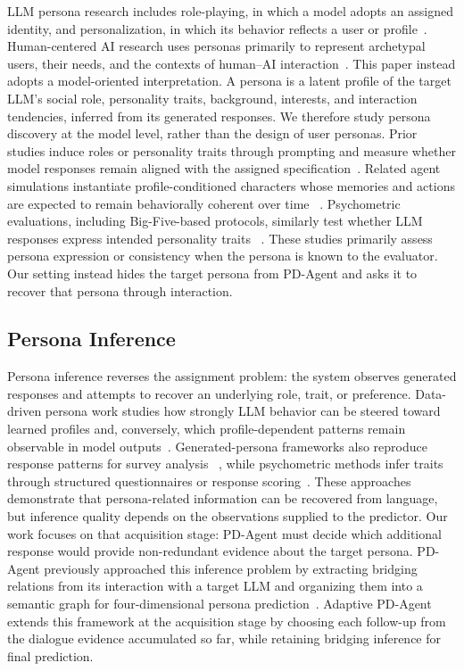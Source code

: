 \documentclass{ieeeaccess}
\begin{document}
LLM persona research includes role-playing, in which a model adopts an assigned identity, and
personalization, in which its behavior reflects a user or profile~\cite{tseng2024survey}.
Human-centered AI research uses personas primarily to represent archetypal users, their
needs, and the contexts of human--AI interaction~\cite{holzinger2022personas}. This paper
instead adopts a model-oriented interpretation. A persona is a latent profile of the target
LLM's social role, personality traits, background, interests, and interaction tendencies,
inferred from its generated responses. We therefore study persona discovery at the model
level, rather than the design of user personas.
%
Prior studies induce roles or personality traits through prompting and measure whether model
responses remain aligned with the assigned specification~\cite{jiang2023evaluating,
li2024steerability}. Related agent simulations instantiate profile-conditioned characters
whose memories and actions are expected to remain behaviorally coherent over time
~\cite{park2023generative}. Psychometric evaluations, including Big-Five-based protocols,
similarly test whether LLM responses express intended personality traits
~\cite{jiang2024personalllm}. These studies primarily assess persona expression or
consistency when the persona is known to the evaluator. Our setting instead hides the target
persona from PD-Agent and asks it to recover that persona through interaction.

\subsection{Persona Inference}

Persona inference reverses the assignment problem: the system observes generated responses and
attempts to recover an underlying role, trait, or preference. Data-driven persona work studies
how strongly LLM behavior can be steered toward learned profiles and, conversely, which
profile-dependent patterns remain observable in model outputs~\cite{li2024steerability}.
Generated-persona frameworks also reproduce response patterns for survey analysis
~\cite{kim2024llmmirror}, while psychometric methods infer traits through structured
questionnaires or response scoring~\cite{jiang2024personalllm}. These approaches demonstrate
that persona-related information can be recovered from language, but inference quality
depends on the observations supplied to the predictor. Our work focuses on that acquisition
stage: PD-Agent must decide which additional response would provide non-redundant evidence
about the target persona. PD-Agent previously approached this inference problem by extracting
bridging relations from its interaction with a target LLM and organizing them into a semantic
graph for four-dimensional persona prediction~\cite{yang2026pragmatic}. Adaptive PD-Agent
extends this framework at the acquisition stage by choosing each follow-up from the dialogue
evidence accumulated so far, while retaining bridging inference for final prediction.
\end{document}
